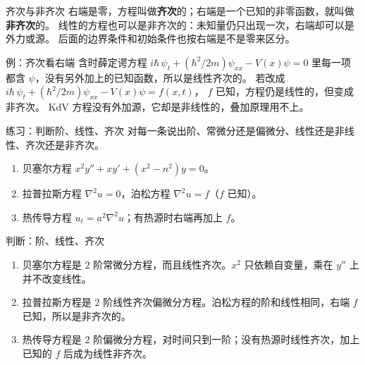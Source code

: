 \documentclass[fontset=windows, chinese, 10pt, xcolor=dvipsnames]{beamer}
\begin{document}
\begin{frame}{齐次与非齐次}
  右端是零，方程叫做\textbf{齐次}的；右端是一个已知的非零函数，就叫做\textbf{非齐次}的。
  \vspace{0.4em}
  线性的方程也可以是非齐次的：未知量仍只出现一次，右端却可以是外力或源。
  后面的边界条件和初始条件也按右端是不是零来区分。
\end{frame}

\begin{frame}{例：齐次看右端}
  含时薛定谔方程
  $i\hbar\,\psi_t+(\hbar^2/2m)\psi_{xx}-V(x)\psi=0$
  里每一项都含 $\psi$，没有另外加上的已知函数，所以是线性齐次的。
  \vspace{0.4em}
  若改成
  $i\hbar\,\psi_t+(\hbar^2/2m)\psi_{xx}-V(x)\psi=f(x,t)$，
  $f$ 已知，方程仍是线性的，但变成非齐次。
  \vspace{0.35em}
  KdV 方程没有外加源，它却是非线性的，叠加原理用不上。
\end{frame}

\begin{frame}{练习：判断阶、线性、齐次}
  对每一条说出阶、常微分还是偏微分、线性还是非线性、齐次还是非齐次。
  \vspace{0.25em}
  \begin{enumerate}
    \item 贝塞尔方程
      $x^2 y''+x y'+(x^2-n^2)y=0$。
    \item 拉普拉斯方程 $\nabla^2 u=0$，泊松方程 $\nabla^2 u=f$（$f$ 已知）。
    \item 热传导方程 $u_t=a^2\nabla^2 u$；有热源时右端再加上 $f$。
  \end{enumerate}
\end{frame}

\begin{frame}{判断：阶、线性、齐次}
  \begin{enumerate}
    \item 贝塞尔方程是 $2$ 阶常微分方程，而且线性齐次。$x^2$ 只依赖自变量，乘在 $y''$ 上并不改变线性。
    \item 拉普拉斯方程是 $2$ 阶线性齐次偏微分方程。泊松方程的阶和线性相同，右端 $f$ 已知，所以是非齐次的。
    \item 热传导方程是 $2$ 阶偏微分方程，对时间只到一阶；没有热源时线性齐次，加上已知的 $f$ 后成为线性非齐次。
  \end{enumerate}
\end{frame}

\end{document}
